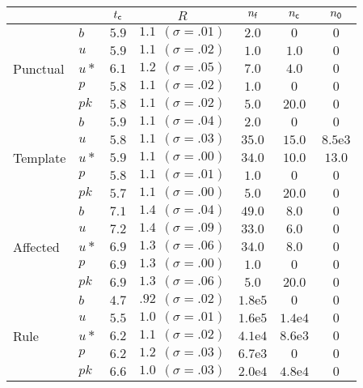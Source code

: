 \begin{tabular}{|l|l||c|c|c|c|c|}
\cline{3-7}\multicolumn{2}{l|}{} &
$t_{\textsf{c}}$ & $R$ & $n_{\textsf{f}}$ & $n_{\textsf{c}}$ & $n_{\textsf{0}}$ \\ 
\hline\hline 
\multirow{5}{*}{\begin{sideways}\footnotesize Punctual \end{sideways}}
& $b$ & $5.9$ & $1.1\ \ {(\sigma=.01)}$ & $2.0$ & $0$ & $0$ \\ 
& $u$ & $5.9$ & $1.1\ \ {(\sigma=.02)}$ & $1.0$ & $1.0$ & $0$ \\ 
& $u*$ & $6.1$ & $1.2\ \ {(\sigma=.05)}$ & $7.0$ & $4.0$ & $0$ \\ 
& $p$ & $5.8$ & $1.1\ \ {(\sigma=.02)}$ & $1.0$ & $0$ & $0$ \\ 
& $pk$ & $5.8$ & $1.1\ \ {(\sigma=.02)}$ & $5.0$ & $20.0$ & $0$ \\ 
\hline
\multirow{5}{*}{\begin{sideways}\footnotesize Template \end{sideways}}
& $b$ & $5.9$ & $1.1\ \ {(\sigma=.04)}$ & $2.0$ & $0$ & $0$ \\ 
& $u$ & $5.8$ & $1.1\ \ {(\sigma=.03)}$ & $35.0$ & $15.0$ & $8.5\mathrm{e}3$ \\ 
& $u*$ & $5.9$ & $1.1\ \ {(\sigma=.00)}$ & $34.0$ & $10.0$ & $13.0$ \\ 
& $p$ & $5.8$ & $1.1\ \ {(\sigma=.01)}$ & $1.0$ & $0$ & $0$ \\ 
& $pk$ & $5.7$ & $1.1\ \ {(\sigma=.00)}$ & $5.0$ & $20.0$ & $0$ \\ 
\hline
\multirow{5}{*}{\begin{sideways}\footnotesize Affected \end{sideways}}
& $b$ & $7.1$ & $1.4\ \ {(\sigma=.04)}$ & $49.0$ & $8.0$ & $0$ \\ 
& $u$ & $7.2$ & $1.4\ \ {(\sigma=.09)}$ & $33.0$ & $6.0$ & $0$ \\ 
& $u*$ & $6.9$ & $1.3\ \ {(\sigma=.06)}$ & $34.0$ & $8.0$ & $0$ \\ 
& $p$ & $6.9$ & $1.3\ \ {(\sigma=.00)}$ & $1.0$ & $0$ & $0$ \\ 
& $pk$ & $6.9$ & $1.3\ \ {(\sigma=.06)}$ & $5.0$ & $20.0$ & $0$ \\ 
\hline
\multirow{5}{*}{\begin{sideways}\footnotesize Rule \end{sideways}}
& $b$ & $4.7$ & $.92\ \ {(\sigma=.02)}$ & $1.8\mathrm{e}5$ & $0$ & $0$ \\ 
& $u$ & $5.5$ & $1.0\ \ {(\sigma=.01)}$ & $1.6\mathrm{e}5$ & $1.4\mathrm{e}4$ & $0$ \\ 
& $u*$ & $6.2$ & $1.1\ \ {(\sigma=.02)}$ & $4.1\mathrm{e}4$ & $8.6\mathrm{e}3$ & $0$ \\ 
& $p$ & $6.2$ & $1.2\ \ {(\sigma=.03)}$ & $6.7\mathrm{e}3$ & $0$ & $0$ \\ 
& $pk$ & $6.6$ & $1.0\ \ {(\sigma=.03)}$ & $2.0\mathrm{e}4$ & $4.8\mathrm{e}4$ & $0$ \\ 
\hline
\end{tabular}

